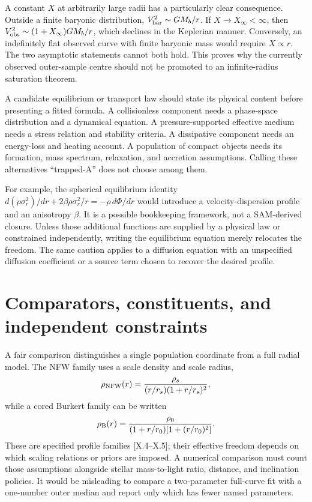 A constant $X$ at arbitrarily large radii has a particularly clear consequence. Outside a finite baryonic distribution, $V_{\rm bar}^2\sim GM_b/r$. If $X\to X_\infty<\infty$, then $V_{\rm obs}^2\sim(1+X_\infty)GM_b/r$, which declines in the Keplerian manner. Conversely, an indefinitely flat observed curve with finite baryonic mass would require $X\propto r$. The two asymptotic statements cannot both hold. This proves why the currently observed outer-sample centre should not be promoted to an infinite-radius saturation theorem.

A candidate equilibrium or transport law should state its physical content before presenting a fitted formula. A collisionless component needs a phase-space distribution and a dynamical equation. A pressure-supported effective medium needs a stress relation and stability criteria. A dissipative component needs an energy-loss and heating account. A population of compact objects needs its formation, mass spectrum, relaxation, and accretion assumptions. Calling these alternatives ``trapped-A'' does not choose among them.

For example, the spherical equilibrium identity $d(\rho\sigma_r^2)/dr+2\beta\rho\sigma_r^2/r=-\rho\,d\Phi/dr$ would introduce a velocity-dispersion profile and an anisotropy $\beta$. It is a possible bookkeeping framework, not a SAM-derived closure. Unless those additional functions are supplied by a physical law or constrained independently, writing the equilibrium equation merely relocates the freedom. The same caution applies to a diffusion equation with an unspecified diffusion coefficient or a source term chosen to recover the desired profile.

\section{Comparators, constituents, and independent constraints}

A fair comparison distinguishes a single population coordinate from a full radial model. The NFW family uses a scale density and scale radius,
\begin{equation}
 \rho_{\rm NFW}(r)=\frac{\rho_s}{(r/r_s)(1+r/r_s)^2},
 \label{c10:nfw}
\end{equation}
while a cored Burkert family can be written
\begin{equation}
 \rho_{\rm B}(r)=\frac{\rho_0}{(1+r/r_0)[1+(r/r_0)^2]}.
 \label{c10:burkert}
\end{equation}
These are specified profile families [X.4--X.5]; their effective freedom depends on which scaling relations or priors are imposed. A numerical comparison must count those assumptions alongside stellar mass-to-light ratio, distance, and inclination policies. It would be misleading to compare a two-parameter full-curve fit with a one-number outer median and report only which has fewer named parameters.

